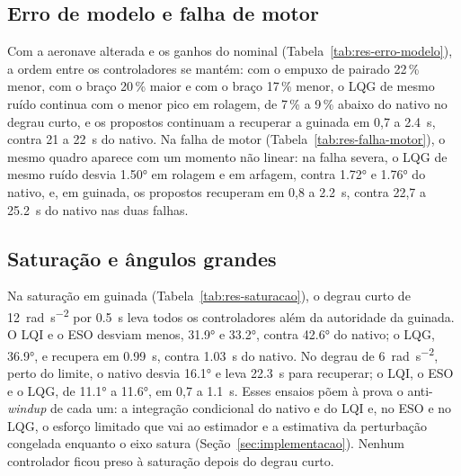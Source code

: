 \subsection{Erro de modelo e falha de motor}

Com a aeronave alterada e os ganhos do nominal
(Tabela~\ref{tab:res-erro-modelo}), a ordem entre os controladores se
mantém: com o empuxo de pairado 22\,\% menor, com o braço 20\,\% maior e com
o braço 17\,\% menor, o LQG de mesmo ruído continua com o menor pico em
rolagem, de 7\,\% a 9\,\% abaixo do nativo no degrau curto, e os propostos
continuam a recuperar a guinada em 0,7 a \SI{2.4}{\second}, contra 21 a
\SI{22}{\second} do nativo. Na falha de motor
(Tabela~\ref{tab:res-falha-motor}), o mesmo quadro aparece com um momento não
linear: na falha severa, o LQG de mesmo ruído desvia \ang{1.50} em rolagem e
em arfagem, contra \ang{1.72} e \ang{1.76} do nativo, e, em guinada, os
propostos recuperam em 0,8 a \SI{2.2}{\second}, contra 22,7 a
\SI{25.2}{\second} do nativo nas duas falhas.

\begin{table}[htbp]
\centering
\caption{Erro de modelo: aeronave alterada, ganhos do nominal.}
\label{tab:res-erro-modelo}
\small
\resizebox{\textwidth}{!}{}

\nota{\raggedright }
\end{table}

\begin{table}[htbp]
\centering
\caption{Falha parcial do motor 1: comando reduzido a 0,95 (leve) e a 0,85
(severa).}
\label{tab:res-falha-motor}
\small
\resizebox{\textwidth}{!}{}

\nota{\raggedright }
\end{table}

\subsection{Saturação e ângulos grandes}
\label{sec:res-saturacao}

Na saturação em guinada (Tabela~\ref{tab:res-saturacao}), o degrau curto
de \SI{12}{\radian\per\second\squared} por \SI{0.5}{\second} leva todos os
controladores além da autoridade da guinada. O LQI e o ESO desviam menos,
\ang{31.9} e \ang{33.2}, contra \ang{42.6} do nativo; o LQG, \ang{36.9}, e
recupera em \SI{0.99}{\second}, contra \SI{1.03}{\second} do nativo. No
degrau de \SI{6}{\radian\per\second\squared}, perto do limite, o nativo
desvia \ang{16.1} e leva \SI{22.3}{\second} para recuperar; o LQI, o ESO e o
LQG, de \ang{11.1} a \ang{11.6}, em 0,7 a \SI{1.1}{\second}. Esses ensaios
põem à prova o anti-\textit{windup} de cada um: a integração condicional do
nativo e do LQI e, no ESO e no LQG, o esforço limitado que vai ao estimador
e a estimativa da perturbação congelada enquanto o eixo satura
(Seção~\ref{sec:implementacao}). Nenhum controlador ficou preso à saturação
depois do degrau curto.

